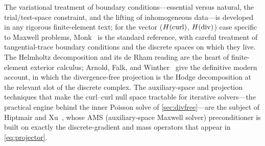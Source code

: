 \furtherreading
The variational treatment of boundary conditions---essential versus natural, the
trial/test-space constraint, and the lifting of inhomogeneous data---is developed
in any rigorous finite-element text; for the vector ($H(\mathrm{curl})$, $H(\mathrm{div})$) case
specific to Maxwell problems, Monk~\citep{monk2003} is the standard reference, with
careful treatment of tangential-trace boundary conditions and the discrete spaces
on which they live. The Helmholtz decomposition and its de Rham reading are the
heart of finite-element exterior calculus; Arnold, Falk, and
Winther~\citep{arnold2006feec} give the definitive modern account, in which the
divergence-free projection is the Hodge decomposition at the relevant slot of the
discrete complex. The auxiliary-space and projection techniques that make the
curl--curl null space tractable for iterative solvers---the practical engine behind
the inner Poisson solve of \cref{sec:divfree}---are the subject of Hiptmair and
Xu~\citep{hiptmairxu2007}, whose AMS (auxiliary-space Maxwell solver) preconditioner
is built on exactly the discrete-gradient and mass operators that appear in
\cref{eq:projector}.

